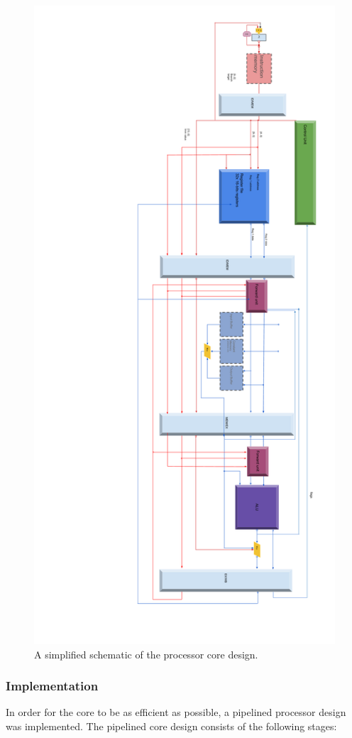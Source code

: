 \begin{figure}[ht]
	\centering
	\includegraphics[width=0.8\linewidth]{figures/fpga/core_schematic}
	\caption{A simplified schematic of the processor core design.}
	\label{fig:core_schematic}
\end{figure}

\subsubsection{Implementation}

In order for the core to be as efficient as possible, a pipelined processor
design was implemented. The pipelined core design consists of the following
stages:

